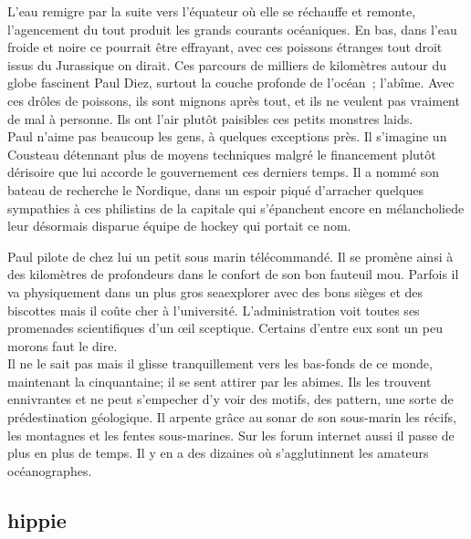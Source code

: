 \documentclass{article}
\begin{document}
L’eau remigre par la suite vers l’équateur où elle se réchauffe et remonte,
l’agencement du tout produit les grands courants océaniques. En bas, dans l’eau
froide et noire ce pourrait être effrayant, avec ces poissons étranges tout
droit issus du Jurassique on dirait. Ces parcours de milliers de kilomètres
autour du globe fascinent Paul Diez, surtout la couche profonde de l’océan ;
l’abîme. Avec ces drôles de poissons, ils sont mignons après tout, et ils ne
veulent pas vraiment de mal à personne. Ils ont l’air plutôt paisibles ces
petits monstres laids.\\

Paul n'aime pas beaucoup les gens, à quelques exceptions près. Il s'imagine un
Cousteau détennant plus de moyens techniques malgré le financement plutôt
dérisoire que lui accorde le gouvernement ces derniers temps. Il a nommé son
bateau de recherche le Nordique, dans un espoir piqué d'arracher quelques
sympathies à ces philistins de la capitale qui s'épanchent encore en
mélancholiede leur désormais disparue équipe de hockey qui portait ce nom.


Paul pilote de chez lui un petit sous marin télécommandé. Il se promène ainsi à
des kilomètres de profondeurs dans le confort de son bon fauteuil mou. Parfois
il va physiquement dans un plus gros seaexplorer avec des bons sièges et des
biscottes mais il coûte cher à l’université. L’administration voit toutes ses
promenades scientifiques d’un œil sceptique. Certains d’entre eux sont un peu
morons faut le dire.  \\


Il ne le sait pas mais il glisse tranquillement vers les bas-fonds de ce monde,
maintenant la cinquantaine; il se sent attirer par les abimes. Ils les trouvent
ennivrantes et ne peut s'empecher d'y voir des motifs, des pattern, une sorte de
prédestination géologique. Il arpente grâce au sonar de son sous-marin les
récifs, les montagnes et les fentes sous-marines. Sur les forum internet aussi
il passe de plus en plus de temps. Il y en a des dizaines où s'agglutinnent les
amateurs océanographes.



\clearpage


\subsection{hippie}
\end{document}
